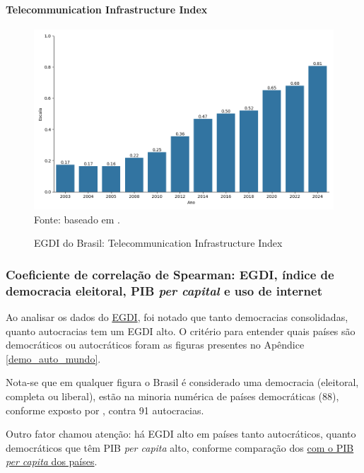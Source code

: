 \paragraph{Telecommunication Infrastructure Index}

\begin{figure}[H]
	\centering
	\caption{EGDI do Brasil: Telecommunication Infrastructure Index}
	\includegraphics[width=1\linewidth]{figuras/egdi/egdi_brasil_tsi.png}
	\label{fig:egdi_brasil_tsi}
	\footnotesize{Fonte: baseado em \cite{ONU_edgi_mapa}.}
\end{figure}

\subsubsection{Coeficiente de correlação de Spearman: EGDI, índice de democracia eleitoral, PIB \textit{per capital} e uso de internet}

Ao analisar os dados do \href{https://publicadministration.un.org/egovkb/en-us/About/Overview/-E-Government-Development-Index}{EGDI}, foi notado que tanto democracias consolidadas, quanto autocracias tem um EGDI alto. O critério para entender quais países são democráticos ou autocráticos foram as figuras presentes no Apêndice \ref{demo_auto_mundo}. 

Nota-se que em qualquer figura o Brasil é considerado uma democracia (eleitoral, completa ou liberal), estão na minoria numérica de países democráticas (88), conforme exposto por \cite{nord2025democracy}, contra 91 autocracias.

Outro fator chamou atenção: há EGDI alto em países tanto autocráticos, quanto democráticos que têm PIB \textit{per capita} alto, conforme comparação dos \href{https://data.worldbank.org/indicator/NY.GDP.PCAP.PP.KD}{com o PIB \textit{per capita} dos países}. 

